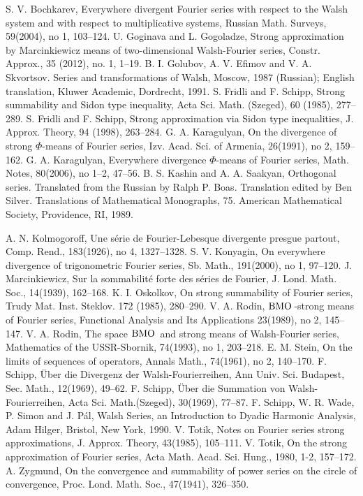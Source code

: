 \documentclass{amsart}
\numberwithin{equation}{section}
\begin{document}
\begin{thebibliography}{99}
S. V. Bochkarev, Everywhere divergent Fourier series with respect to the Walsh system and with respect to multiplicative systems, Russian Math. Surveys, 59(2004), no 1, 103--124.
U. Goginava and L. Gogoladze, Strong approximation by Marcinkiewicz means of two-dimensional Walsh-Fourier series, Constr. Approx., 35 (2012), no.
1, 1--19.
B. I. Golubov, A. V. Efimov and V. A. Skvortsov. Series and transformations of Walsh, Moscow, 1987 (Russian); English translation, Kluwer
Academic, Dordrecht, 1991.
S. Fridli and F. Schipp, Strong summability and Sidon type inequality, Acta Sci. Math. (Szeged), 60 (1985), 277--289.
S. Fridli and F. Schipp, Strong approximation via Sidon type inequalities, J. Approx. Theory, 94 (1998), 263--284.
G. A. Karagulyan, On the divergence of strong $\Phi$-means of Fourier series, Izv. Acad. Sci. of Armenia, 26(1991), no 2, 159--162.
G. A. Karagulyan, Everywhere divergence $\Phi$-means of Fourier series, Math. Notes, 80(2006), no 1--2, 47--56.
B. S. Kashin and A. A. Saakyan, Orthogonal series. Translated from the Russian by Ralph P. Boas. Translation edited by Ben Silver. Translations of Mathematical Monographs, 75. American Mathematical Society, Providence, RI, 1989.

A. N. Kolmogoroff, Une s\'{e}rie de Fourier-Lebesque divergente presgue partout,
Comp. Rend., 183(1926), no 4,  1327--1328.
S. V. Konyagin, On everywhere divergence of trigonometric Fourier series, Sb. Math., 191(2000), no 1,  97--120.
 J.  Marcinkiewicz, Sur la sommabilit\'{e} forte des s\'{e}ries de Fourier,
J. Lond. Math. Soc., 14(1939), 162--168.
K. I. Oskolkov, On strong summability of Fourier series, Trudy Mat. Inst. Steklov. 172 (1985), 280--290.
V. A. Rodin, ${{\rm BMO\,}}$-strong means of Fourier series, Functional Analysis and Its Applications
23(1989), no 2, 145--147.
V. A. Rodin, The space ${{\rm BMO\,}}$ and strong means of Walsh-Fourier series, Mathematics of the USSR-Sbornik, 74(1993), no 1, 203--218.
E. M. Stein, On the limits of sequences of operators, Annals Math., 74(1961), no 2, 140--170.
F. Schipp, \"{U}ber die Divergenz der Walsh-Fourierreihen, Ann Univ. Sci. Budapest, Sec. Math., 12(1969),  49--62.
F. Schipp, \"{U}ber die Summation von Walsh-Fourierreihen,  Acta Sci. Math.(Szeged),
30(1969), 77--87.
F. Schipp, W. R. Wade,  P. Simon and J. P\'{a}l, Walsh Series, an Introduction to Dyadic Harmonic Analysis, Adam Hilger, Bristol, New York, 1990.
 V. Totik, Notes on Fourier series strong approximations,
J. Approx. Theory, 43(1985), 105--111.
 V. Totik, On the strong approximation of Fourier series,
Acta Math. Acad. Sci. Hung., 1980, 1-2, 157--172.
 A.  Zygmund, On the convergence and summability of power series on
the circle of convergence, Proc. Lond. Math. Soc., 47(1941), 326--350.
\end{thebibliography}
\end{document}
